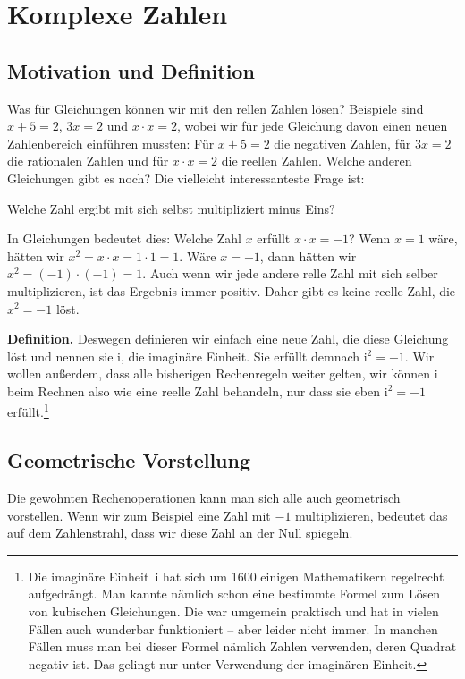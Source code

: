 \documentclass{zirkelblatt1415}
\newcommand{\ii}{\mathrm{i}}
\begin{document}


\section{Komplexe Zahlen}

\subsection{Motivation und Definition}

Was für Gleichungen können wir mit den rellen Zahlen lösen? Beispiele sind $x+5=2$, $3x=2$ und $x\cdot x=2$, wobei wir für jede Gleichung davon einen neuen Zahlenbereich einführen mussten: F\"ur $x+5=2$ die negativen Zahlen, f\"ur $3x=2$ die rationalen Zahlen und f\"ur $x\cdot x=2$ die reellen Zahlen. Welche anderen Gleichungen gibt es noch? Die vielleicht interessanteste Frage ist:
\begin{center}
Welche Zahl ergibt mit sich selbst multipliziert minus Eins?
\end{center}
In Gleichungen bedeutet dies: Welche Zahl $x$ erf\"ullt $x\cdot x=-1$? Wenn $x=1$ wäre, hätten wir $x^2=x\cdot x=1 \cdot 1 =1$. Wäre $x=-1$, dann hätten wir $x^2=(-1)\cdot(-1)=1$. Auch wenn wir jede andere relle Zahl mit sich selber multiplizieren, ist das Ergebnis immer positiv. Daher gibt es keine reelle Zahl, die $x^2=-1$ löst.


\textbf{Definition.} Deswegen definieren wir einfach eine neue Zahl, die diese Gleichung löst und nennen sie $\ii$, die imaginäre Einheit. Sie erfüllt demnach $\ii^2=-1$. Wir wollen außerdem, dass alle bisherigen Rechenregeln weiter gelten, wir können $\ii$ beim Rechnen also wie eine reelle Zahl behandeln, nur dass sie eben $\ii^2=-1$ erfüllt.\footnote{Die imaginäre Einheit~$\ii$ hat sich um 1600 einigen Mathematikern regelrecht aufgedrängt. Man kannte nämlich schon eine bestimmte Formel zum Lösen von kubischen Gleichungen. Die war umgemein praktisch und hat in vielen Fällen auch wunderbar funktioniert -- aber leider nicht immer. In manchen Fällen muss man bei dieser Formel nämlich Zahlen verwenden, deren Quadrat negativ ist. Das gelingt nur unter Verwendung der imaginären Einheit.}

\subsection{Geometrische Vorstellung}

Die gewohnten Rechenoperationen kann man sich alle auch geometrisch vorstellen. Wenn wir zum Beispiel eine Zahl mit $-1$ multiplizieren, bedeutet das auf dem Zahlenstrahl, dass wir diese Zahl an der Null spiegeln.
\end{document}
